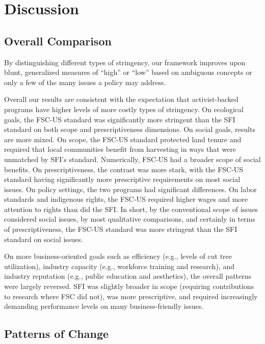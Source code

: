 \documentclass[
      12pt,
            Review ]{article}
\begin{document}
\hypertarget{discussion}{%
\section{Discussion}\label{discussion}}

\hypertarget{overall-comparison}{%
\subsection{Overall Comparison}\label{overall-comparison}}

By distinguishing different types of stringency, our framework improves upon blunt, generalized measures of ``high'' or ``low'' based on ambiguous concepts or only a few of the many issues a policy may address.

Overall our results are consistent with the expectation that activist-backed programs have higher levels of more costly types of stringency. On ecological goals, the FSC-US standard was significantly more stringent than the SFI standard on both scope and prescriptiveness dimensions. On social goals, results are more mixed. On scope, the FSC-US standard protected land tenure and required that local communities benefit from harvesting in ways that were unmatched by SFI's standard. Numerically, FSC-US had a broader scope of social benefits. On prescriptiveness, the contrast was more stark, with the FSC-US standard having significantly more prescriptive requirements on most social issues. On policy settings, the two programs had significant differences. On labor standards and indigenous rights, the FSC-US required higher wages and more attention to rights than did the SFI. In short, by the conventional scope of issues considered social issues, by most qualitative comparisons, and certainly in terms of prescriptiveness, the FSC-US standard was more stringent than the SFI standard on social issues.

On more business-oriented goals such as efficiency (e.g., levels of cut tree utilization), industry capacity (e.g., workforce training and research), and industry reputation (e.g., public education and aesthetics), the overall patterns were largely reversed. SFI was slightly broader in scope (requiring contributions to research where FSC did not), was more prescriptive, and required increasingly demanding performance levels on many business-friendly issues.

\hypertarget{patterns-of-change}{%
\subsection{Patterns of Change}\label{patterns-of-change}}
\end{document}
